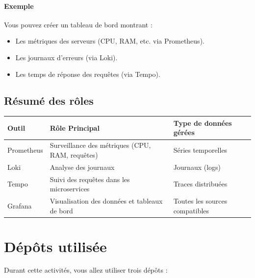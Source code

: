 \documentclass[french, 12pt]{article}%
\newcommand{\itemE}{\item[$\bullet$]}
\begin{document}
\paragraph{Exemple}
Vous pouvez créer un tableau de bord montrant :
\begin{itemize}
    \itemE Les métriques des serveurs (CPU, RAM, etc. via Prometheus).
    \itemE Les journaux d'erreurs (via Loki).
    \itemE Les temps de réponse des requêtes (via Tempo).
\end{itemize}

\subsection{Résumé des rôles}


\footnotesize
\begin{center}

    \begin{tabular}{|l|l|l|}
        \hline
        \rowcolor{vert_capet}\textbf{Outil} & \textbf{Rôle Principal} & \textbf{Type de données gérées} \\
        \hline
        Prometheus & Surveillance des métriques (CPU, RAM, requêtes) & Séries temporelles \\
        Loki       & Analyse des journaux                             & Journaux (logs)    \\
        Tempo      & Suivi des requêtes dans les microservices       & Traces distribuées \\
        Grafana    & Visualisation des données et tableaux de bord  & Toutes les sources compatibles \\
        \hline
    \end{tabular}
\end{center}
\normalsize

\section{Dépôts utilisée}

Durant cette activités, vous allez utiliser trois dépôts : 
\end{document}
